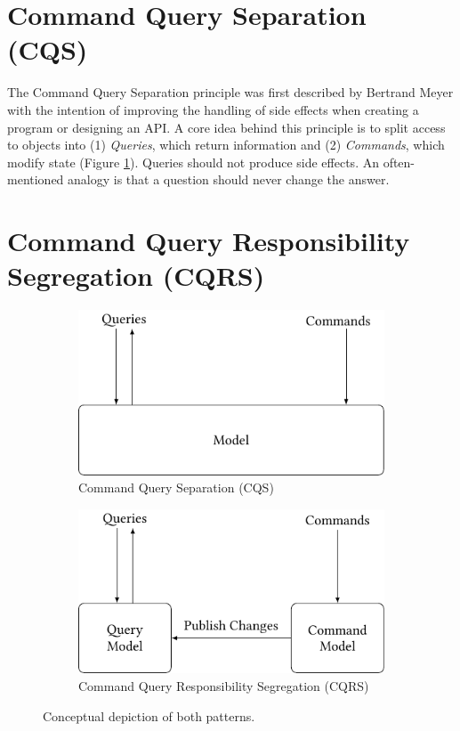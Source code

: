 \section{Command Query Separation (CQS)}
The Command Query Separation principle was first described by Bertrand Meyer 
\mbox{\cite[p.~747]{Meyer1998}} with the intention of improving the handling 
of side effects when creating a program or designing an API. 
A core idea behind this principle is to split access to objects into 
(1) \emph{Queries}, which return information and (2) \emph{Commands}, which 
modify state (Figure \ref{fig:cqs}). Queries should not produce side effects.
An often-mentioned analogy is that a question should never change the answer.

\section{Command Query Responsibility Segregation (CQRS)}
\label{sec:cqrs}

\begin{figure}[t]
	\begin{subfigure}[t]{0.48\textwidth}
	       \includegraphics[width=\textwidth]
			{../illustrations/cqs.pdf}
		\caption{
			Command Query Separation (CQS)
		}
		\label{fig:cqs}
	\end{subfigure}
	\quad
	\begin{subfigure}[t]{0.48\textwidth}
	       \includegraphics[width=\textwidth]
			{../illustrations/cqrs.pdf}
		\caption{
			Command Query Responsibility Segregation (CQRS)
		}
		\label{fig:cqrs}
	\end{subfigure}
	\caption{Conceptual depiction of both patterns.}
\end{figure}

